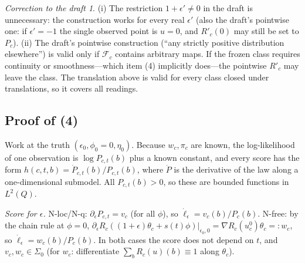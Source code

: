 \documentclass[11pt,a4paper]{article}
\theoremstyle{definition}
\theoremstyle{remark}
\newtheorem*{correction}{Correction to the draft}
\newcommand{\eps}{\epsilon}
\begin{document}
\begin{correction}
(i) The restriction $1+\eps'\neq0$ in the draft is unnecessary: the construction
works for every real $\eps'$ (also the draft's pointwise one: if $\eps'=-1$ the single
observed point is $u=0$, and $R'_c(0)$ may still be set to $P_c$).
(ii) The draft's pointwise construction (``any strictly positive distribution
elsewhere'') is valid only if $\mathcal F_c$ contains arbitrary maps. If the frozen
class requires continuity or smoothness---which item (4) implicitly does---the
pointwise $R'_c$ may leave the class. The translation above is valid for every class
closed under translations, so it covers all readings.
\end{correction}

\subsection{Proof of (4)}
Work at the truth $(\eps_0,\phi_0{=}0,\eta_0)$. Because $w_c,\pi_c$ are known, the
log-likelihood of one observation is $\log P_{c,t}(b)$ plus a known constant, and every
score has the form $h(c,t,b)=\dot P_{c,t}(b)/P_{c,t}(b)$, where $\dot P$ is the
derivative of the law along a one-dimensional submodel. All $P_{c,t}(b)>0$, so these are
bounded functions in $L^2(Q)$.

\emph{Score for $\eps$.} N-loc/N-q: $\partial_\eps P_{c,t}=v_c$ (for all $\phi$),
so $\dot\ell_\eps=v_c(b)/P_c(b)$. N-free: by the chain rule at $\phi=0$,
$\partial_\eps R_c((1+\eps)\theta_c+s(t)\phi)\big|_{\eps_0,0}
=\nabla R_c(u^0_c)\theta_c=:w_c$, so $\dot\ell_\eps=w_c(b)/P_c(b)$. In both cases the
score does not depend on $t$, and $v_c,w_c\in\Sigma_0$ (for $w_c$: differentiate
$\sum_bR_c(u)(b)\equiv1$ along $\theta_c$).
\end{document}
